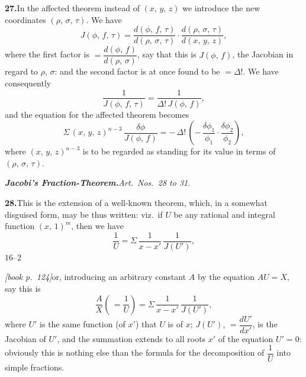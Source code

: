 \documentclass[11pt,a4paper]{article}
\theoremstyle{plain}
\theoremstyle{definition}
\theoremstyle{remark}
\begin{document}
\medskip\noindent\textbf{27.}\quad In the affected theorem instead of $(x,\,y,\,z)$ we introduce the new coordinates $(\rho,\,\sigma,\,\tau)$. We have
\[
J(\phi,\,f,\,\tau) = \frac{d(\phi,\,f,\,\tau)}{d(\rho,\,\sigma,\,\tau)}\cdot\frac{d(\rho,\,\sigma,\,\tau)}{d(x,\,y,\,z)},
\]
where the first factor is $= \dfrac{d(\phi,\,f)}{d(\rho,\,\sigma)}$, say that this is $J(\phi,\,f)$, the Jacobian in regard to $\rho$, $\sigma$: and the second factor is at once found to be $= \Delta!$. We have consequently
\[
\frac{1}{J(\phi,\,f,\,\tau)} = \frac{1}{\Delta!\,J(\phi,\,f)},
\]
and the equation for the affected theorem becomes
\[
\Sigma\,(x,\,y,\,z)^{n-3}\,\frac{\delta\phi}{J(\phi,\,f)} = -\,\Delta!\,\left(-\,\frac{\delta\phi_1}{\phi_1}\cdot\frac{\delta\phi_2}{\phi_2}\right),
\]
where $(x,\,y,\,z)^{n-3}$ is to be regarded as standing for its value in terms of $(\rho,\,\sigma,\,\tau)$.

\medskip\noindent\textit{\textbf{Jacobi's Fraction-Theorem.}\quad Art.\ Nos.\ 28 to 31.}

\medskip\noindent\textbf{28.}\quad This is the extension of a well-known theorem, which, in a somewhat disguised form, may be thus written: viz.\ if $U$ be any rational and integral function $(x,\,1)^m$, then we have
\[
\frac{1}{U} = \Sigma\,\frac{1}{x - x'}\,\frac{1}{J(U')},
\]
\hfill $16$--$2$

\noindent\textit{[book p.~124]}\quad or, introducing an arbitrary constant $A$ by the equation $AU = X$, say this is
\[
\frac{A}{X}\left(\,= \frac{1}{U}\right) = \Sigma\,\frac{1}{x - x'}\,\frac{1}{J(U')},
\]
where $U'$ is the same function (of $x'$) that $U$ is of $x$; $J(U')$, $= \dfrac{dU'}{dx'}$, is the Jacobian of $U'$, and the summation extends to all roots $x'$ of the equation $U' = 0$: obviously this is nothing else than the formula for the decomposition of $\dfrac{1}{U}$ into simple fractions.
\end{document}
